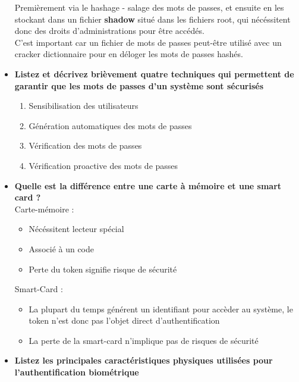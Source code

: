 \documentclass{report}
\begin{document}
\begin{itemize}
					Premièrement via le hashage - salage des mots de passes, et ensuite en les stockant dans un fichier \textbf{shadow} situé dans les fichiers root, qui nécéssitent donc des droits d'administrations pour être accédés.\\
					C'est important car un fichier de mots de passes peut-être utilisé avec un cracker dictionnaire pour en déloger les mots de passes hashés.\\

				\item \textbf{Listez et décrivez brièvement quatre techniques qui permettent de garantir que les mots de passes d'un système sont sécurisés}\\

					\begin{enumerate}
						\item Sensibilisation des utilisateurs
						\item Génération automatiques des mots de passes
						\item Vérification des mots de passes
						\item Vérification proactive des mots de passes\\
					\end{enumerate}

				\item \textbf{Quelle est la différence entre une carte à mémoire et une smart card ?}\\

					Carte-mémoire : 
					\begin{itemize}
						\item Nécéssitent lecteur spécial
						\item Associé à un code
						\item Perte du token signifie risque de sécurité\\
					\end{itemize}

					Smart-Card :
					\begin{itemize}
						\item La plupart du temps générent un identifiant pour accèder au système, le token n'est donc pas l'objet direct d'authentification
						\item La perte de la smart-card n'implique pas de risques de sécurité\\
					\end{itemize}

				\item \textbf{Listez les principales caractéristiques physiques utilisées pour l'authentification biométrique}\\


\end{itemize}
\end{document}
